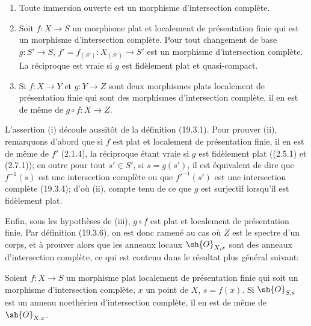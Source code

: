\begin{proposition}[19.3.9]
\label{IV.19.3.9}
\begin{enumerate}
  \item[\textup{(i)}] Toute immersion ouverte est un morphisme d'intersection complète.
  \item[\textup{(ii)}] Soit $f:X\to S$ un morphisme plat et localement de présentation finie qui est un morphisme d'intersection complète. Pour tout changement de base $g:S'\to S$, $f'=f_{(S')}:X_{(S')}\to S'$ est un morphisme d'intersection complète. La réciproque est vraie si $g$ est fidèlement plat et quasi-compact.
  \item[\textup{(iii)}] Si $f:X\to Y$ et $g:Y\to Z$ sont deux morphismes plats localement de présentation finie qui sont des morphismes d'intersection complète, il en est de même de $g\circ f:X\to Z$.
\end{enumerate}
\end{proposition}

L'assertion (i) découle aussitôt de la définition (19.3.1). Pour prouver (ii), remarquons d'abord que si $f$ est plat et localement de présentation finie, il en est de
même de $f'$ (2.1.4), la réciproque étant vraie si $g$ est fidèlement plat ((2.5.1) et (2.7.1)); en outre pour tout $s'\in S'$, si $s=g(s')$, il est équivalent de dire que $f^{-1}(s)$ est une intersection complète ou que $f'^{-1}(s')$ est une intersection complète (19.3.4); d'où (ii), compte tenu de ce que $g$ est surjectif lorsqu'il est fidèlement plat.

Enfin, sous les hypothèses de (iii), $g\circ f$ est plat et localement de présentation finie. Par définition (19.3.6), on est donc ramené au cas où $Z$ est le spectre d'un corps, et à prouver alors que les anneaux locaux $\sh{O}_{X,x}$ sont des anneaux d'intersection complète, ce qui est contenu dans le résultat plus général suivant:

\begin{corollary}[19.3.10]
\label{IV.19.3.10}
Soient $f:X\to S$ un morphisme plat localement de présentation finie qui soit un morphisme d'intersection complète, $x$ un point de $X$, $s=f(x)$. Si $\sh{O}_{S,s}$ est un anneau noethérien d'intersection complète, il en est de même de $\sh{O}_{X,x}$.
\end{corollary}

